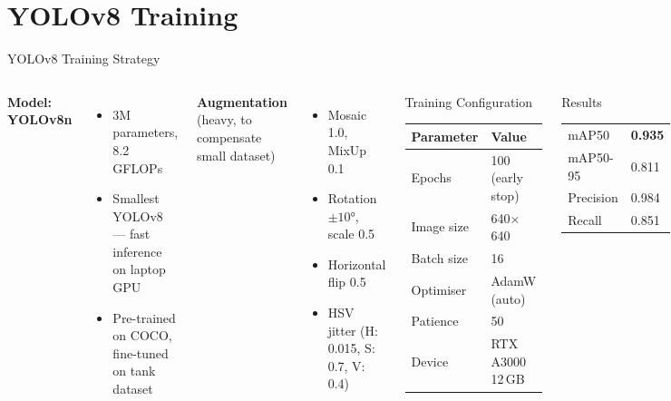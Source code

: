\documentclass[aspectratio=169]{beamer}
\begin{document}
\section{YOLOv8 Training}

\begin{frame}{YOLOv8 Training Strategy}
\begin{columns}[T]
\textbf{Model: YOLOv8n}
\begin{itemize}
  \item 3M parameters, 8.2 GFLOPs
  \item Smallest YOLOv8 — fast inference on laptop GPU
  \item Pre-trained on COCO, fine-tuned on tank dataset
\end{itemize}

\vspace{0.3cm}
\textbf{Augmentation} (heavy, to compensate small dataset)
\begin{itemize}
  \item Mosaic 1.0, MixUp 0.1
  \item Rotation $\pm10°$, scale 0.5
  \item Horizontal flip 0.5
  \item HSV jitter (H: 0.015, S: 0.7, V: 0.4)
\end{itemize}

\begin{block}{Training Configuration}
\small
\begin{tabular}{ll}
\toprule
Parameter   & Value \\
\midrule
Epochs      & 100 (early stop) \\
Image size  & 640$\times$640 \\
Batch size  & 16 \\
Optimiser   & AdamW (auto) \\
Patience    & 50 \\
Device      & RTX A3000 12\,GB \\
\bottomrule
\end{tabular}
\end{block}

\begin{exampleblock}{Results}
\small
\begin{tabular}{ll}
mAP50           & \textbf{0.935} \\
mAP50-95        & 0.811 \\
Precision       & 0.984 \\
Recall          & 0.851 \\
\end{tabular}
\end{exampleblock}
\end{columns}
\end{frame}
\end{document}
